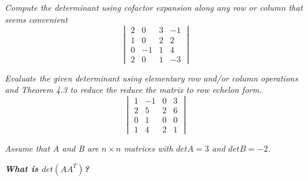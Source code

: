 \documentclass[12pt,letterpaper]{hmcpset}
\begin{document}
\section*{}





\begin{problem}[4.2.14]
\textit{Compute the determinant using cofactor expansion along any row or column that seems convenient}
$$
\begin{vmatrix}
2&0&3&-1\\
1&0&2&2\\
0&-1&1&4\\
2&0&1&-3
\end{vmatrix}
$$
\end{problem}

\begin{solution}
\end{solution}

\newpage



\begin{problem}[4.2.24]
\textit{Evaluate the given determinant using elementary row and/or column operations and Theorem 4.3 to reduce the reduce the matrix to row echelon form. }
$$
\begin{vmatrix}
1&-1&0&3\\
2&5&2&6\\
0&1&0&0\\
1&4&2&1
\end{vmatrix}
$$
\end{problem}
\begin{solution}
\end{solution}

\newpage



\begin{problem}[4.2.52]
\textit{Assume that A and B are $ n\times n$ matrices with $det A =3 $ and $det B = -2$.}
\begin{center}
\textbf{\textit{What is $det(AA^T)$?}}
\end{center}
\end{problem}
\end{document}
